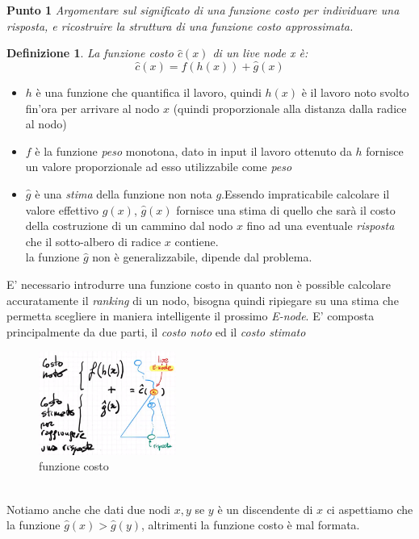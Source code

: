 \documentclass[a4paper]{article}
\newtheorem*{definition}{Definizione}
\begin{document}
\textbf{Punto 1}
\emph{Argomentare sul significato di una funzione costo per individuare una risposta, e ricostruire la struttura di una funzione costo approssimata.}
\begin{adjustwidth}{.8cm}{0cm}
\label{SEC:C3.1}
\begin{definition}
	La \textit{funzione costo} $\hat c(x)$ di un \textit{live node x} è: $$\hat c(x) = f(h(x)) + \hat g(x)$$
\end{definition}
\begin{itemize}
	\item$h$ è una funzione che quantifica il lavoro, quindi $h(x)$ è il lavoro noto svolto fin'ora per arrivare al nodo $x$ (quindi proporzionale alla distanza dalla radice al nodo)
	\item$f$ è la funzione \emph{peso} monotona, dato in input il lavoro ottenuto da $h$ fornisce un valore proporzionale ad esso utilizzabile come \emph{peso}
	\item$\hat g$ è una \textit{stima} della funzione non nota $g$.Essendo impraticabile calcolare il valore effettivo $g(x)$, $\hat g(x)$ fornisce una stima di quello che sarà il costo della costruzione di un cammino dal nodo $x$ fino ad una eventuale \textit{risposta} che il sotto-albero di radice $x$ contiene.\\
		la funzione $\hat g$ non è generalizzabile, dipende dal problema.
\end{itemize}
E' necessario introdurre una funzione costo in quanto non è possible calcolare accuratamente il \textit{ranking} di un nodo, bisogna quindi ripiegare su una stima che permetta scegliere in maniera intelligente il prossimo \textit{E-node}.
E' composta principalmente da due parti, il \textit{costo noto} ed il \textit{costo stimato}\\
\begin{figure}[!ht]
\centering
\includegraphics[width=0.4\textwidth]{./img/C_3_punto1.png}
\caption{funzione costo} \label{FIG:C_3_punto1}
\end{figure}\\
Notiamo anche che dati due nodi $x,y$ se $y$ è un discendente di $x$ ci aspettiamo che la funzione $\hat g(x) > \hat g(y)$, altrimenti la funzione costo è mal formata.
\end{adjustwidth}
\end{document}

